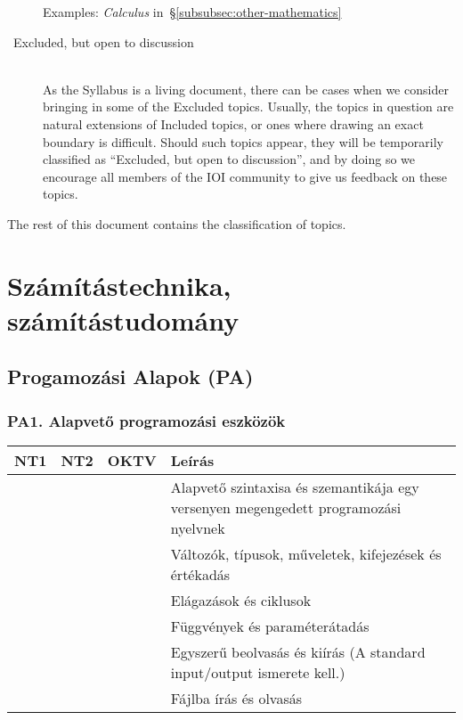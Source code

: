 \documentclass[a4paper,11pt,oneside]{article}
\newcommand{\cmark}{\ding{51}}%
\newcommand{\xmark}{\ding{55}}%
\newcommand{\Cincluded}{{\small\cmark}}
\newcommand{\Cexmaybe}{{\small\xmark\faQuestionCircle}}
\newcommand{\Ctable}[1]{
    \begin{center}
        \begin{tabular}{ | C | C | C | m{8cm} |}
        \hline
        NT1 & NT2 & OKTV & Leírás \\ \hline
        #1
        \end{tabular}
    \end{center}    
}
\begin{document}
\begin{description}
    Examples: \emph{Calculus\/} in~\S\ref{subsubsec:other-mathematics}

\item[\Cexmaybe\ Excluded, but open to discussion]~\\
    As the Syllabus is a living document, there can be cases when we consider
    bringing in some of the Excluded topics. Usually, the topics in question
    are natural extensions of Included topics, or ones where drawing an exact
    boundary is difficult. Should such topics appear, they will be temporarily
    classified as ``Excluded, but open to discussion'', and by doing so we encourage 
    all members of the IOI community to give us feedback on these topics.
\end{description}

\bigskip

\noindent
The rest of this document contains the classification of topics.


\section {Számítástechnika, számítástudomány} %
\label{subsec:computing-science}

\subsection {Progamozási Alapok (PA)} %
\label{subsubsec:PF}

    \subsubsection*{PA1. Alapvető programozási eszközök} %

    \Ctable {
        \Cincluded & \Cincluded & \Cincluded &
        Alapvető szintaxisa és szemantikája egy versenyen megengedett programozási nyelvnek \\ \hline
        
        \Cincluded & \Cincluded & \Cincluded &
        Változók, típusok, műveletek, kifejezések és értékadás \\ \hline
        
        \Cincluded & \Cincluded & \Cincluded &
        Elágazások és ciklusok \\ \hline
        
        \Cincluded & \Cincluded & \Cincluded &
        Függvények és paraméterátadás \\ \hline
        
        \Cincluded & \Cincluded & \Cincluded &
        Egyszerű beolvasás és kiírás (A standard input/output ismerete kell.) \\ \hline
        
        \Cexmaybe & \Cexmaybe & \Cexmaybe &
        Fájlba írás és olvasás \\ \hline
    }
\end{document}
